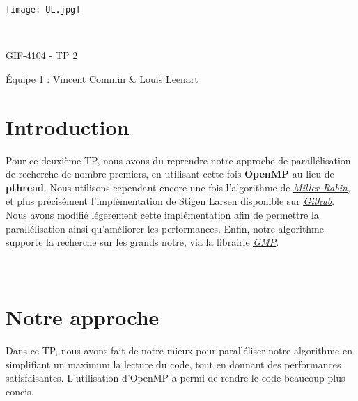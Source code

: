 \documentclass[a4paper, french]{article}
\author{Vincent Commin \& Louis Leenart}
\date{\today}
\begin{document}
\begin{titlepage}
    \begin{flushleft}
        \texttt{[image: UL.jpg]}\par
        \centering
        
        \vspace{13\baselineskip}       
        \HRule \\[0.4cm]

        {\Huge 
        GIF-4104 - TP 2\par}
        \vspace{0.4cm}
        \HRule
        \vfill
        Équipe 1 : Vincent Commin \& Louis Leenart\medskip \par
    \end{flushleft}
\end{titlepage}

\newpage
\section{Introduction}

Pour ce deuxième TP, nous avons du reprendre notre approche de parallélisation de recherche de
nombre premiers, en utilisant cette fois \textbf{OpenMP} au lieu de \textbf{pthread}. Nous utilisons
cependant encore une fois l'algorithme de
\href{https://fr.wikipedia.org/wiki/Test_de_primalit%C3%A9_de_Miller-Rabin}{\textit{\underline{Miller-Rabin}}}, et plus 
précisément l'implémentation de Stigen Larsen disponible sur
\href{https://github.com/cslarsen/miller-rabin}{\textit{\underline{Github}}}. Nous avons modifié
légerement cette implémentation afin de permettre la parallélisation ainsi qu'améliorer les
performances. Enfin, notre algorithme supporte la recherche sur les grands notre, via la librairie
\href{https://gmplib.org/}{\textit{\underline{GMP}}}. \\\\\\

\section{Notre approche}

Dans ce TP, nous avons fait de notre mieux pour paralléliser notre algorithme en simplifiant un
maximum la lecture du code, tout en donnant des performances satisfaisantes. L'utilisation
d'OpenMP a permi de rendre le code beaucoup plus concis. \\\\
\end{document}
